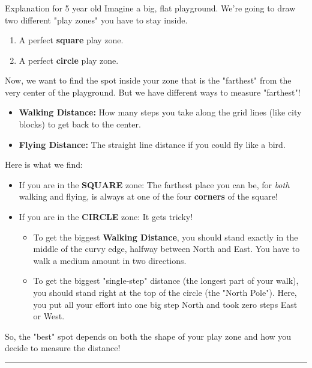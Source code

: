 \documentclass{article}
\begin{document}
\subsubsection*{\normalfont}{Explanation for 5 year old}
Imagine a big, flat playground. We're going to draw two different "play zones" you have to stay inside.
\begin{enumerate}
    \item A perfect \textbf{square} play zone.
    \item A perfect \textbf{circle} play zone.
\end{enumerate}
Now, we want to find the spot inside your zone that is the "farthest" from the very center of the playground. But we have different ways to measure "farthest"!
\begin{itemize}
    \item \textbf{Walking Distance:} How many steps you take along the grid lines (like city blocks) to get back to the center.
    \item \textbf{Flying Distance:} The straight line distance if you could fly like a bird.
\end{itemize}
Here is what we find:
\begin{itemize}
    \item If you are in the \textbf{SQUARE} zone: The farthest place you can be, for \textit{both} walking and flying, is always at one of the four \textbf{corners} of the square!
    \item If you are in the \textbf{CIRCLE} zone: It gets tricky!
    \begin{itemize}
        \item To get the biggest \textbf{Walking Distance}, you should stand exactly in the middle of the curvy edge, halfway between North and East. You have to walk a medium amount in two directions.
        \item To get the biggest "single-step" distance (the longest part of your walk), you should stand right at the top of the circle (the "North Pole"). Here, you put all your effort into one big step North and took zero steps East or West.
    \end{itemize}
\end{itemize}
So, the "best" spot depends on both the shape of your play zone and how you decide to measure the distance!

\noindent\rule{\textwidth}{0.4pt}\\

\newpage

\end{document}
